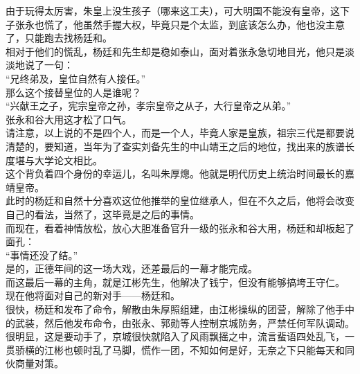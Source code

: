 \begin{multicols}{\theparacolNo}
由于玩得太厉害，朱皇上没生孩子（哪来这工夫），可大明国不能没有皇帝，这下子张永也慌了，他虽然手握大权，毕竟只是个太监，到底该怎么办，他也没主意了，只能跑去找杨廷和。\\

相对于他们的慌乱，杨廷和先生却是稳如泰山，面对着张永急切地目光，他只是淡淡地说了一句：\\

“兄终弟及，皇位自然有人接任。”\\

那么这个接替皇位的人是谁呢？\\

“兴献王之子，宪宗皇帝之孙，孝宗皇帝之从子，大行皇帝之从弟。”\\

张永和谷大用这才松了口气。\\

请注意，以上说的不是四个人，而是一个人，毕竟人家是皇族，祖宗三代是都要说清楚的，要知道，当年为了查实刘备先生的中山靖王之后的地位，找出来的族谱长度堪与大学论文相比。\\

这个背负着四个身份的幸运儿，名叫朱厚熜。他就是明代历史上统治时间最长的嘉靖皇帝。\\

此时的杨廷和自然十分喜欢这位他推举的皇位继承人，但在不久之后，他将会改变自己的看法，当然了，这毕竟是之后的事情。\\

而现在，看着神情放松，放心大胆准备官升一级的张永和谷大用，杨廷和却板起了面孔：\\

“事情还没了结。”\\

是的，正德年间的这一场大戏，还差最后的一幕才能完成。\\

而这最后一幕的主角，就是江彬先生，他解决了钱宁，但没有能够搞垮王守仁。\\

现在他将面对自己的新对手——杨廷和。\\

很快，杨廷和发布了命令，解散由朱厚照组建，由江彬操纵的团营，解除了他手中的武装，然后他发布命令，由张永、郭勋等人控制京城防务，严禁任何军队调动。\\

很明显，这是要动手了，京城很快就陷入了风雨飘摇之中，流言蜚语四处乱飞，一贯骄横的江彬也顿时乱了马脚，慌作一团，不知如何是好，无奈之下只能每天和同伙商量对策。\\


\end{multicols}
